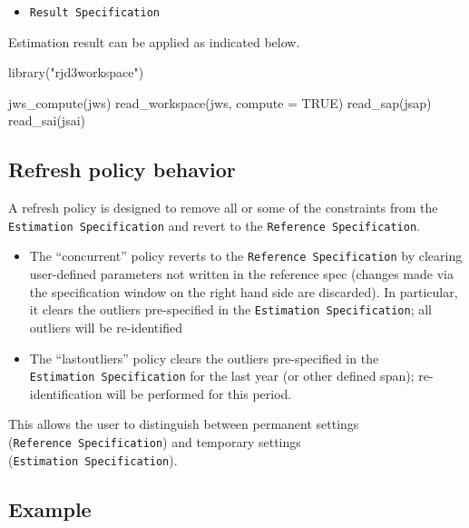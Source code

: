 \documentclass[
  letterpaper,
  DIV=11,
  numbers=noendperiod]{scrreprt}
\newenvironment{Shaded}{\begin{snugshade}}{\end{snugshade}}
\newcommand{\AttributeTok}[1]{\textcolor[rgb]{0.40,0.45,0.13}{#1}}
\newcommand{\ConstantTok}[1]{\textcolor[rgb]{0.56,0.35,0.01}{#1}}
\newcommand{\FunctionTok}[1]{\textcolor[rgb]{0.28,0.35,0.67}{#1}}
\newcommand{\NormalTok}[1]{\textcolor[rgb]{0.00,0.23,0.31}{#1}}
\newcommand{\StringTok}[1]{\textcolor[rgb]{0.13,0.47,0.30}{#1}}
\providecommand{\tightlist}{%
  \setlength{\itemsep}{0pt}\setlength{\parskip}{0pt}}\usepackage{longtable,booktabs,array}
\begin{document}
\begin{itemize}
\tightlist
\item
  \texttt{Result\ Specification}
\end{itemize}

Estimation result can be applied as indicated below.

\begin{Shaded}
\begin{Highlighting}[]
\FunctionTok{library}\NormalTok{(}\StringTok{"rjd3workspace"}\NormalTok{)}

\FunctionTok{jws\_compute}\NormalTok{(jws)}
\FunctionTok{read\_workspace}\NormalTok{(jws, }\AttributeTok{compute =} \ConstantTok{TRUE}\NormalTok{)}
\FunctionTok{read\_sap}\NormalTok{(jsap)}
\FunctionTok{read\_sai}\NormalTok{(jsai)}
\end{Highlighting}
\end{Shaded}

\hypertarget{comp-refresh}{%
\subsection*{Refresh policy behavior}\label{comp-refresh}}

A refresh policy is designed to remove all or some of the constraints
from the \texttt{Estimation\ Specification} and revert to the
\texttt{Reference\ Specification}.

\begin{itemize}
\item
  The ``concurrent'' policy reverts to the
  \texttt{Reference\ Specification} by clearing user-defined parameters
  not written in the reference spec (changes made via the specification
  window on the right hand side are discarded). In particular, it clears
  the outliers pre-specified in the \texttt{Estimation\ Specification};
  all outliers will be re-identified
\item
  The ``lastoutliers'' policy clears the outliers pre-specified in the
  \texttt{Estimation\ Specification} for the last year (or other defined
  span); re-identification will be performed for this period.
\end{itemize}

This allows the user to distinguish between permanent settings
(\texttt{Reference\ Specification}) and temporary settings
(\texttt{Estimation\ Specification}).

\hypertarget{example}{%
\subsection*{Example}\label{example}}
\end{document}
